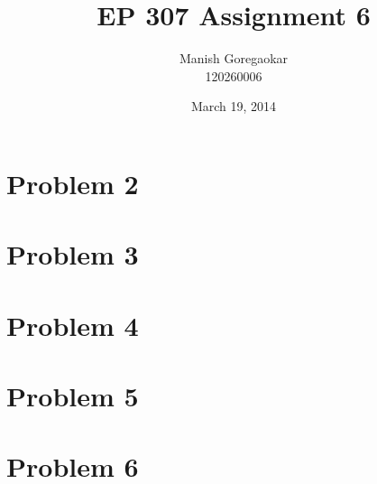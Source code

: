 \documentclass[12pt]{article}
\title{EP 307 Assignment 6}
\author{Manish Goregaokar\\120260006}
\date{March 19, 2014}
\begin{document}
\maketitle
\section*{Problem 2}
\section*{Problem 3}
\section*{Problem 4}
\section*{Problem 5}
\section*{Problem 6}
\end{document}
